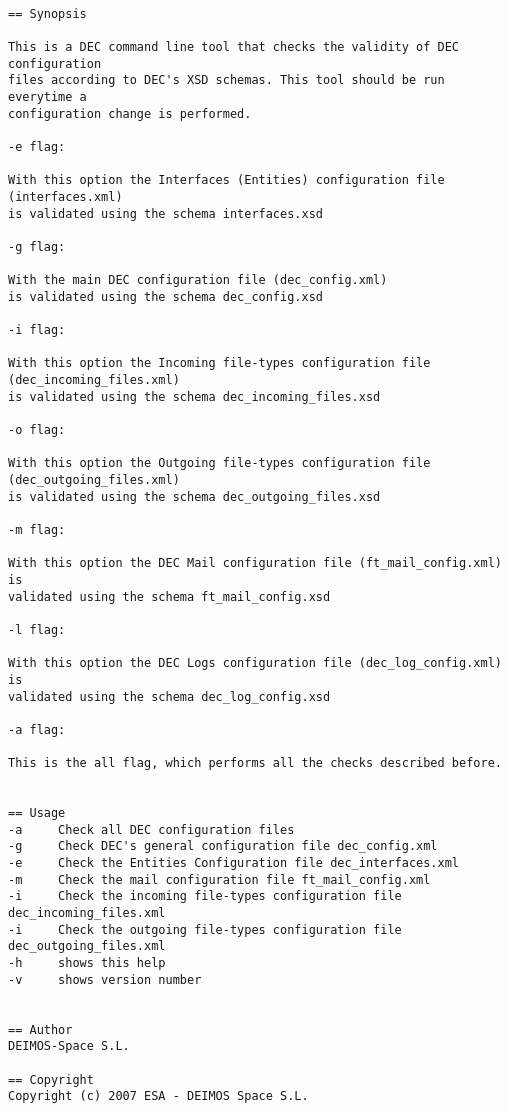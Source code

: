 \documentclass[dec_sum_main.tex]{subfiles}
\begin{document}
\begin{verbatim}

== Synopsis

This is a DEC command line tool that checks the validity of DEC configuration
files according to DEC's XSD schemas. This tool should be run everytime a 
configuration change is performed.

-e flag:

With this option the Interfaces (Entities) configuration file (interfaces.xml)
is validated using the schema interfaces.xsd

-g flag:

With the main DEC configuration file (dec_config.xml)
is validated using the schema dec_config.xsd

-i flag:

With this option the Incoming file-types configuration file (dec_incoming_files.xml)
is validated using the schema dec_incoming_files.xsd

-o flag:

With this option the Outgoing file-types configuration file (dec_outgoing_files.xml)
is validated using the schema dec_outgoing_files.xsd

-m flag:

With this option the DEC Mail configuration file (ft_mail_config.xml) is
validated using the schema ft_mail_config.xsd

-l flag:

With this option the DEC Logs configuration file (dec_log_config.xml) is
validated using the schema dec_log_config.xsd

-a flag:

This is the all flag, which performs all the checks described before.


== Usage
-a     Check all DEC configuration files
-g     Check DEC's general configuration file dec_config.xml
-e     Check the Entities Configuration file dec_interfaces.xml
-m     Check the mail configuration file ft_mail_config.xml
-i     Check the incoming file-types configuration file dec_incoming_files.xml
-i     Check the outgoing file-types configuration file dec_outgoing_files.xml
-h     shows this help
-v     shows version number


== Author
DEIMOS-Space S.L.

== Copyright
Copyright (c) 2007 ESA - DEIMOS Space S.L.

\end{verbatim}
\end{document}
